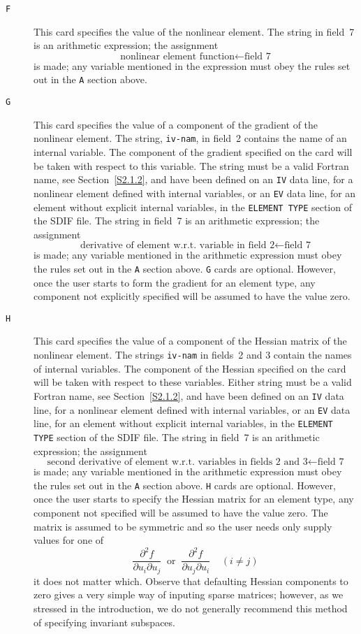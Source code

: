 \documentclass[a4paper]{article}
\newcommand{\ms}{\;\;\;\;}
\newcommand{\tim}[1]{\;\; \mbox{#1} \;\;}
\newcommand{\itt}[1]{\item[\tt #1]}
\newcommand{\bdmath}{\begin{displaymath}}
\newcommand{\edmath}{\end{displaymath}}
\begin{document}
\begin{description}
\itt{F}
This card
specifies the value of the nonlinear element.
The string in field~7 is an arithmetic expression; the assignment
\bdmath
\mbox{nonlinear element function} \leftarrow \mbox{field~7}
\edmath
is made; any variable mentioned in the  expression must obey the rules
set out in the {\tt A}
section above.

\itt{G}
This card
specifies the value of  a component of the  gradient
of  the  nonlinear element.  The  string,   {\tt  iv-nam}, in  field~2
contains  the name of  an  internal  variable.   The  component of the
gradient specified  on  the card
will  be taken  with respect  to this
variable.  The string must be a valid Fortran name,
see  Section~\ref{S2.1.2}, and have been  defined on  an {\tt IV}
data line, for a nonlinear element
defined with internal variables,
or an {\tt EV}
data  line,  for  an   element  without explicit   internal
variables,  in the {\tt  ELEMENT TYPE}
section of  the SDIF file.  The  string in  field~7  is  an arithmetic
expression; the assignment
\bdmath
\mbox{derivative of element w.r.t. variable in field~2} \leftarrow
\mbox{field~7}
\edmath
is made; any variable mentioned in the arithmetic expression must obey
the rules set out in the {\tt A}
section  above.
{\tt G}
cards
are  optional.  However, once
the  user starts to   form the  gradient for an
element type,
any component  not explicitly  specified will be assumed
to have the value zero.

\itt{H}
This card
specifies the value of a  component of the Hessian matrix of
the nonlinear element.  The  strings {\tt iv-nam} in fields~2  and 3
contain the names of internal variables.  The component of the Hessian
specified on the  card will be taken with  respect to these variables.
Either string must be a valid Fortran  name, see Section~\ref{S2.1.2},
and have been  defined  on an  {\tt  IV}
data  line, for  a  nonlinear element
defined with internal variables,
or an {\tt EV}
data line, for
an element without explicit  internal variables, in  the  {\tt ELEMENT
TYPE}
section of the  SDIF  file.   The string in  field~7  is an arithmetic
expression; the assignment
\bdmath
\mbox{second derivative  of element w.r.t. variables in fields~2 and 3}
\leftarrow \mbox{field~7}
\edmath
is made; any variable mentioned in the arithmetic expression must obey
the rules set  out in the  {\tt A}
section  above.   {\tt H}
cards
are  optional.  However, once  the  user starts to  specify  the
Hessian matrix  for an element type,  any component not specified will
be assumed to have  the value  zero.  The   matrix  is  assumed  to be
symmetric and so the user needs only supply values for one of
\bdmath
\frac{\partial^2f}{\partial u_i \partial u_j}
\tim{or}
\frac{\partial^2f}{\partial u_j \partial u_i}
\ms (i \neq j)
\edmath
it does not matter which.  Observe  that defaulting Hessian components
to zero gives a very simple way of  inputing sparse matrices;
however,  as  we stressed in  the  introduction,   we do not generally
recommend this method of specifying invariant subspaces.
\end{description}
\end{document}
